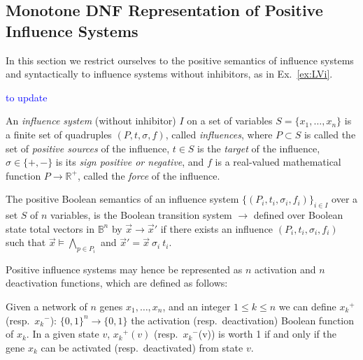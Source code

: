 \documentclass{llncs}
\newcommand{\francois}[1]{\textcolor{blue}{#1}}
\newcommand{\lra}{\longrightarrow}
\begin{document}
\subsection{Monotone DNF Representation of Positive Influence Systems}


In this section we restrict ourselves to the positive semantics of influence systems
and syntactically to influence systems without inhibitors, as in Ex.~\ref{ex:LVi}.

\francois{to update}

\begin{definition}
	
	An \emph{influence system} (without inhibitor) $I$ on a set of variables $S=\{x_1,\dots,x_n\}$ is a
	finite set of quadruples $(P, t, \sigma, f)$, called \emph{influences}, where
	$P\subset S$ is called the set of \emph{positive sources} of the influence,
	$t\in S$ is the \emph{target} of the influence,
	$\sigma\in\{+,-\}$ is its \emph{sign positive or negative}, and $f$ is a
	real-valued mathematical function $P\to\mathbb{R^+}$, called the
	\emph{force} of the influence.
	
\end{definition}

\begin{definition}
	The positive Boolean semantics of an influence system $\{(P_i, t_i, \sigma_i, f_i)\}_{i\in I}$
	over a set $S$ of $n$ variables,
	is the Boolean transition system $\lra$ defined over Boolean state total vectors in $\mathbb{B}^n$
	by
	${\vec x}\lra{\vec x'}$ if there exists an influence $(P_i, t_i, \sigma_i, f_i)$
	such that ${\vec x}\models \bigwedge_{p\in P_i}$
	and ${\vec x'} = {\vec x}\ \sigma_i\ t_i$.
\end{definition}

Positive influence systems may hence be represented as $n$ activation and $n$ deactivation functions, which are defined as follows:


\begin{definition}
	\label{def:activation}
	Given a network of $n$ genes $x_1,\ldots,x_n$, and
	an integer $1 \leq k \leq n$ we can define ${x_k}^+$ (resp.\ ${x_k}^-$):
	${\{0,1\}}^n \rightarrow\{0,1\}$ the activation (resp.\ deactivation)
	Boolean function of $x_k$. In a given state $v$, ${x_k}^+(v)$ (resp.\
   ${x_k}^-$(v)) is worth 1 if and only if the gene $x_k$ can be activated
   (resp.\ deactivated) from state $v$.
\end{definition}
\end{document}
